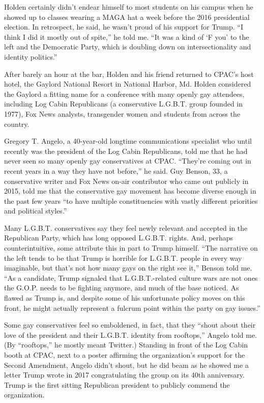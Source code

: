 Holden certainly didn't endear himself to most students on his campus
when he showed up to classes wearing a MAGA hat a week before the 2016
presidential election. In retrospect, he said, he wasn't proud of his
support for Trump. ``I think I did it mostly out of spite,'' he told me.
``It was a kind of `F you' to the left and the Democratic Party, which
is doubling down on intersectionality and identity politics.''

After barely an hour at the bar, Holden and his friend returned to
CPAC's host hotel, the Gaylord National Resort in National Harbor, Md.
Holden considered the Gaylord a fitting name for a conference with many
openly gay attendees, including Log Cabin Republicans (a conservative
L.G.B.T. group founded in 1977), Fox News analysts, transgender women
and students from across the country.

Gregory T. Angelo, a 40-year-old longtime communications specialist who
until recently was the president of the Log Cabin Republicans, told me
that he had never seen so many openly gay conservatives at CPAC.
``They're coming out in recent years in a way they have not before,'' he
said. Guy Benson, 33, a conservative writer and Fox News on-air
contributor who came out publicly in 2015, told me that the conservative
gay movement has become diverse enough in the past few years ``to have
multiple constituencies with vastly different priorities and political
styles.''

Many L.G.B.T. conservatives say they feel newly relevant and accepted in
the Republican Party, which has long opposed L.G.B.T. rights. And,
perhaps counterintuitive, some attribute this in part to Trump himself.
``The narrative on the left tends to be that Trump is horrible for
L.G.B.T. people in every way imaginable, but that's not how many gays on
the right see it,'' Benson told me. ``As a candidate, Trump signaled
that L.G.B.T.-related culture wars are not ones the G.O.P. needs to be
fighting anymore, and much of the base noticed. As flawed as Trump is,
and despite some of his unfortunate policy moves on this front, he might
actually represent a fulcrum point within the party on gay issues.''

Some gay conservatives feel so emboldened, in fact, that they ``shout
about their love of the president and their L.G.B.T. identity from
rooftops,'' Angelo told me. (By ``rooftops,'' he mostly meant Twitter.)
Standing in front of the Log Cabin booth at CPAC, next to a poster
affirming the organization's support for the Second Amendment, Angelo
didn't shout, but he did beam as he showed me a letter Trump wrote in
2017 congratulating the group on its 40th anniversary. Trump is the
first sitting Republican president to publicly commend the organization.

